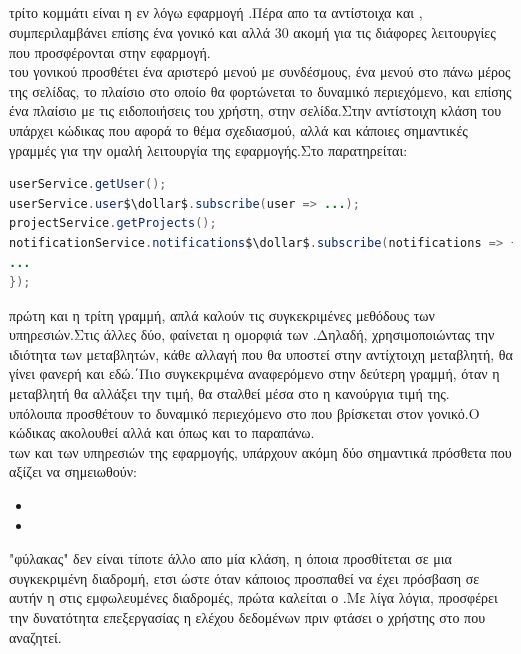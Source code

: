 \subsection*{}
 τρίτο κομμάτι είναι η εν λόγω εφαρμογή .Πέρα απο τα αντίστοιχα  και , συμπεριλαμβάνει επίσης ένα γονικό  και αλλά 30 ακομή για τις διάφορες λειτουργίες που προσφέρονται στην εφαρμογή.\\
  του γονικού  προσθέτει ένα αριστερό μενού με συνδέσμους, ένα μενού στο πάνω μέρος της σελίδας, το πλαίσιο στο οποίο θα φορτώνεται το δυναμικό περιεχόμενο, και επίσης ένα πλαίσιο με τις ειδοποιήσεις του χρήστη, στην σελίδα.Στην αντίστοιχη κλάση του  υπάρχει κώδικας που αφορά το θέμα σχεδιασμού, αλλά και κάποιες σημαντικές γραμμές για την ομαλή λειτουργία της εφαρμογής.Στο  παρατηρείται:\\
	\begin{lstlisting}[language=Java]
userService.getUser();
userService.user$\dollar$.subscribe(user => ...);
projectService.getProjects();
notificationService.notifications$\dollar$.subscribe(notifications => {
...
});
	\end{lstlisting}
 πρώτη και η τρίτη γραμμή, απλά καλούν τις συγκεκριμένες μεθόδους των υπηρεσιών.Στις άλλες δύο, φαίνεται η ομορφιά των .Δηλαδή, χρησιμοποιώντας την ιδιότητα  των  μεταβλητών, κάθε αλλαγή που θα υποστεί στην αντίχτοιχη μεταβλητή, θα γίνει φανερή και εδώ.΄Πιο συγκεκριμένα αναφερόμενο στην δεύτερη γραμμή, όταν η μεταβλητή  θα αλλάξει την τιμή, θα σταλθεί μέσα στο  η κανούργια τιμή της.\\
 υπόλοιπα  προσθέτουν το δυναμικό περιεχόμενο στο  που βρίσκεται στον γονικό.Ο κώδικας ακολουθεί  αλλά και  όπως και το παραπάνω.\\
 των  και των υπηρεσιών της εφαρμογής, υπάρχουν ακόμη δύο σημαντικά πρόσθετα που αξίζει να σημειωθούν:
\begin{itemize}
	\item {}
	\item {}
\end{itemize}
 "φύλακας" δεν είναι τίποτε άλλο απο μία κλάση, η όποια προσθίτεται σε μια συγκεκριμένη διαδρομή, ετσι ώστε όταν κάποιος προσπαθεί να έχει πρόσβαση σε αυτήν η στις εμφωλευμένες διαδρομές, πρώτα καλείται ο .Με λίγα λόγια, προσφέρει την δυνατότητα επεξεργασίας η ελέχου δεδομένων πριν φτάσει ο χρήστης στο  που αναζητεί.\\
